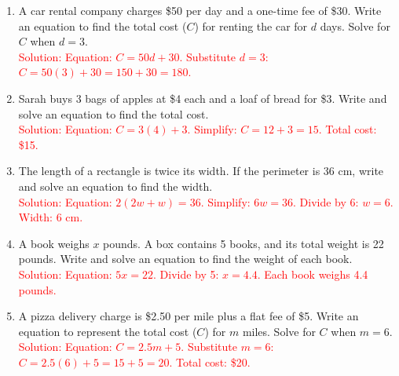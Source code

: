 \documentclass[12pt]{article}
\begin{document}
\begin{tcolorbox}[colframe=black!60, colback=white, 
coltitle=black, colbacktitle=black!15, fonttitle=\bfseries\Large, 
title=Problems, halign title=center, left=10pt, right=10pt, top=10pt, bottom=60pt]
\begin{enumerate}[start=9, itemsep=5em]
    \item A car rental company charges \$50 per day and a one-time fee of \$30. Write an equation to find the total cost (\(C\)) for renting the car for \(d\) days. Solve for \(C\) when \(d = 3\).\\
    \textcolor{red}{Solution: Equation: \( C = 50d + 30 \). Substitute \( d = 3 \): \( C = 50(3) + 30 = 150 + 30 = 180 \).}

    \item Sarah buys 3 bags of apples at \$4 each and a loaf of bread for \$3. Write and solve an equation to find the total cost.\\
    \textcolor{red}{Solution: Equation: \( C = 3(4) + 3 \). Simplify: \( C = 12 + 3 = 15 \). Total cost: \$15.}

    \item The length of a rectangle is twice its width. If the perimeter is 36 cm, write and solve an equation to find the width.\\
    \textcolor{red}{Solution: Equation: \( 2(2w + w) = 36 \). Simplify: \( 6w = 36 \). Divide by 6: \( w = 6 \). Width: 6 cm.}

    \item A book weighs \(x\) pounds. A box contains 5 books, and its total weight is 22 pounds. Write and solve an equation to find the weight of each book.\\
    \textcolor{red}{Solution: Equation: \( 5x = 22 \). Divide by 5: \( x = 4.4 \). Each book weighs 4.4 pounds.}

    \item A pizza delivery charge is \$2.50 per mile plus a flat fee of \$5. Write an equation to represent the total cost (\(C\)) for \(m\) miles. Solve for \(C\) when \(m = 6\).\\
    \textcolor{red}{Solution: Equation: \( C = 2.5m + 5 \). Substitute \( m = 6 \): \( C = 2.5(6) + 5 = 15 + 5 = 20 \). Total cost: \$20.}
\end{enumerate}
\end{tcolorbox}
\end{document}
